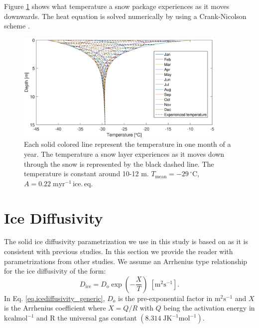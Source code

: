 \documentclass[11pt, draftcls, onecolumn]{IEEEtran} %
\numberwithin{equation}{section}
\numberwithin{table}{section}
\numberwithin{figure}{section}
\begin{document}
\begin{appendices}
Figure \ref{fig:firn_temp_profle} shows what temperature a snow package experiences as it moves downwards.
The heat equation is solved numerically by using a Crank-Nicolson scheme \citep{durran}.
\begin{figure}[]
	\vspace*{2mm}
	\begin{center}
		\includegraphics[width=0.9\textwidth]{firn_temp_profile.eps}
		\caption{Each solid colored line represent the temperature in one month of a year. 
			The temperature a snow layer experiences as it moves down through the snow
			is represented by the black dashed line. 
			The temperature is constant around 10-12 m. $T_{\mathrm{mean}} = -29 \,^{\circ} \mathrm{C}$,
			$A = 0.22 \;\mathrm{myr^{-1}\,ice.\, eq.}$}  \label{fig:firn_temp_profle}
	\end{center}
\end{figure}


\section{Ice Diffusivity} \label{sec:appendix_ice_diffusion}
The solid ice diffusivity parametrization we use in this study is based on \cite{Ramseier1967} 
as it is consistent with previous studies.
In this section we provide the reader with parametrizations from other studies. 
We assume an Arrhenius type relationship for the ice diffusivity of the form:
\begin{equation}
D_{\mathrm{ice}} = D_o \exp \left(- \frac{X}{T} \right) \;\mathrm{ [m^2 s^{-1}]} . 
\label{eq.icediffusivity_generic}
\end{equation}
In Eq. \ref{eq.icediffusivity_generic}, $D_o$ is the pre-exponential factor in $\mathrm{m^2s^{-1}}$
and $X$ is the Arrhenius coefficient where $X = Q/R$ with $Q$ being the activation energy in 
$\mathrm{kcalmol^{-1}}$ and R the universal gas constant $(8.314 \; \mathrm{JK^{-1}mol^{-1}})$.


\end{appendices}
\end{document}
